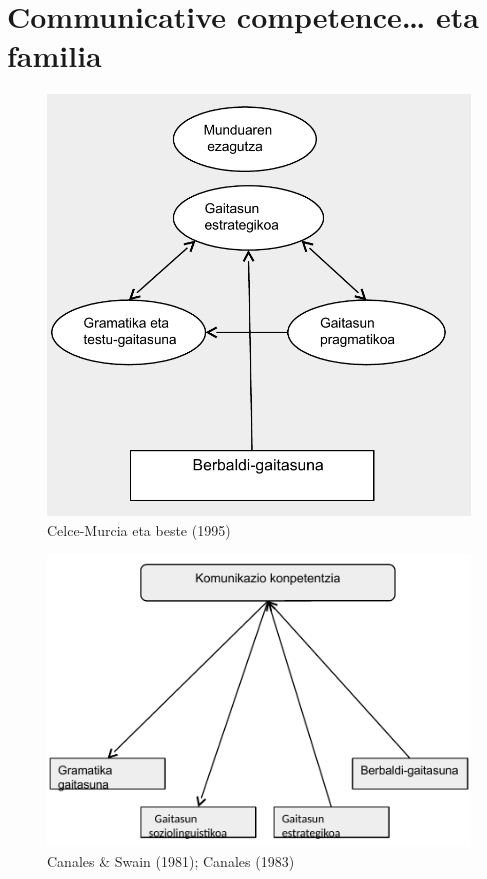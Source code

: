 \documentclass[
]{book}
\begin{document}
\hypertarget{communicative-competence-eta-familia}{%
\section{Communicative competence\ldots{} eta familia}\label{communicative-competence-eta-familia}}

\begin{figure}
\centering
\includegraphics{assets/celce-murcia1995.png}
\caption{Celce-Murcia eta beste (1995)}
\end{figure}

\begin{figure}
\centering
\includegraphics{assets/canale-swain1981.png}
\caption{Canales \& Swain (1981); Canales (1983)}
\end{figure}
\end{document}
